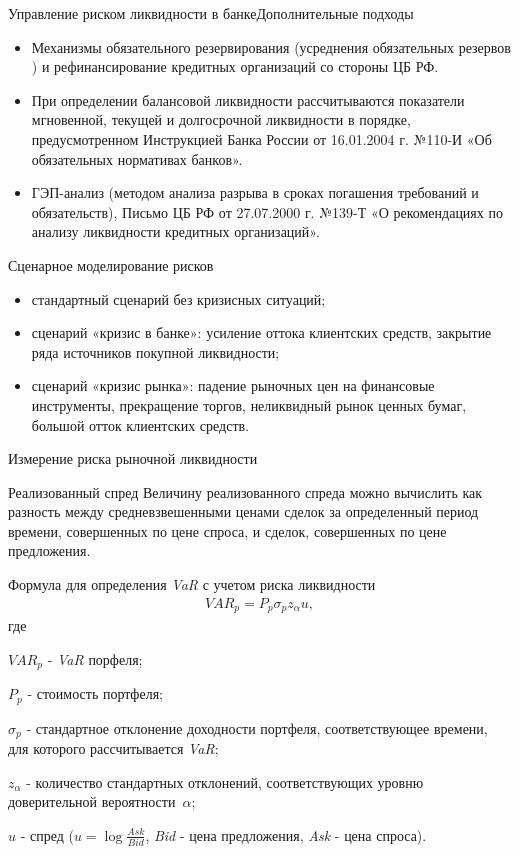 \documentclass[financial_risks_lectures.tex]{subfiles}
\begin{document}
\begin{frame}{Управление риском ликвидности в банке}{Дополнительные подходы}
\begin{itemize}[<+->]
\item
Механизмы обязательного резервирования (усреднения обязательных резервов ) и рефинансирование кредитных организаций со стороны ЦБ РФ.
\item
При определении балансовой ликвидности рассчитываются показатели мгновенной, текущей и долгосрочной ликвидности в порядке, предусмотренном Инструкцией Банка России от 16.01.2004 г. №110-И «Об обязательных нормативах банков».
\item
ГЭП-анализ (методом анализа разрыва в сроках погашения требований и обязательств), Письмо ЦБ РФ от 27.07.2000 г. №139-Т «О рекомендациях по анализу ликвидности кредитных организаций».
\end{itemize}
\end{frame}

\begin{frame}{Сценарное моделирование рисков}
\begin{itemize}[<+->]
\item
стандартный сценарий без кризисных ситуаций;
\item
сценарий «кризис в банке»: усиление оттока клиентских средств, закрытие ряда источников покупной ликвидности;
\item
сценарий «кризис рынка»: падение рыночных цен на финансовые инструменты, прекращение торгов, неликвидный рынок ценных бумаг, большой отток клиентских средств.
\end{itemize}
\end{frame}

\begin{frame}{Измерение риска рыночной ликвидности}
\begin{block}{Реализованный спред}
Величину реализованного спреда можно вычислить как разность между средневзвешенными ценами сделок за определенный период времени, совершенных по цене спроса, и сделок, совершенных по цене предложения. 
\end{block}
\end{frame}
\begin{frame}[shrink=10]{Формула для определения \textit{VaR }с учетом риска ликвидности}
\begin{align}
VAR_p=P_p \sigma_p z_{\alpha} u,
\end{align}
где

$VAR_p$ - \textit{VaR }порфеля;

$P_p$ - стоимость портфеля;

$\sigma_p$ - стандартное отклонение доходности портфеля, соответствующее времени, для которого рассчитывается \textit{VaR};

$z_{\alpha}$ - количество стандартных отклонений, соответствующих уровню доверительной вероятности~$\alpha$;

$u$ - спред ($u=\log \frac{Ask}{Bid}$, \textit{Bid }- цена предложения, \textit{Ask }- цена спроса).

\end{frame}
\end{document}
